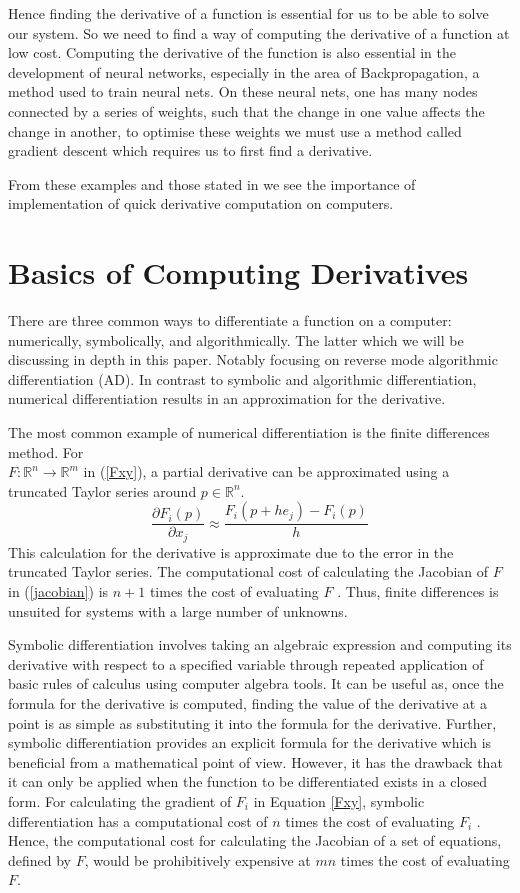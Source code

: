 \documentclass{article}
\begin{document}
Hence finding the derivative of a function is essential for us to be able to solve our system. So we need to find a way of computing the derivative of a function at low cost. Computing the derivative of the function is also essential in the development of neural networks, especially in the area of Backpropagation, a method used to train neural nets. On these neural nets, one has many nodes connected by a series of weights, such that the change in one value affects the change in another, to optimise these weights we must use a method called gradient descent which requires us to first find a derivative.

From these examples and those stated in \cite{appad} we see the importance of implementation of quick derivative computation on computers.

\section{Basics of Computing Derivatives}

There are three common ways to differentiate a function on a computer: numerically, symbolically, and algorithmically. The latter which we will be discussing in depth in this paper. Notably focusing on reverse mode algorithmic differentiation (AD). In contrast to symbolic and algorithmic differentiation, numerical differentiation results in an approximation for the derivative.

The most common example of numerical differentiation is the finite differences method. For \\ $F: \mathbb{R}^n \longrightarrow \mathbb{R}^m$ in (\ref{Fxy}), a partial derivative can be approximated using a truncated Taylor series around $p \in \mathbb{R}^n$. 
\begin{equation*}
    \frac{\partial F_i (p)}{\partial x_j} \approx \frac{F_i(p+he_j) - F_i(p)}{h}
\end{equation*}
This calculation for the derivative is approximate due to the error in the truncated Taylor series. The computational cost of calculating the Jacobian of $F$ in (\ref{jacobian}) is $n + 1$ times the cost of evaluating $F$ \cite{chem}. Thus, finite differences is unsuited for systems with a large number of unknowns.

Symbolic differentiation involves taking an algebraic expression and computing its derivative with respect to a specified variable through repeated application of basic rules of calculus using computer algebra tools. It can be useful as, once the formula for the derivative is computed, finding the value of the derivative at a point is as simple as substituting it into the formula for the derivative.  Further, symbolic differentiation provides an explicit formula for the derivative which is beneficial from a mathematical point of view. However, it has the drawback that it can only be applied when the function to be differentiated exists in a closed form. For calculating the gradient of $F_i$ in Equation \ref{Fxy}, symbolic differentiation has a computational cost of $n$ times the cost of evaluating $F_i$ \cite{chem}. Hence, the computational cost for calculating the Jacobian of a set of equations, defined by $F$, would be prohibitively expensive at $mn$ times the cost of evaluating $F$.
\end{document}

